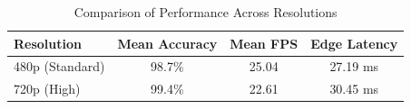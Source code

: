 \begin{table}[htbp]
\caption{Comparison of Performance Across Resolutions}
\label{tab:robustness_res}
\centering
\begin{tabular}{l c c c}
\hline
\hline
\textbf{Resolution} & \textbf{Mean Accuracy} & \textbf{Mean FPS} & \textbf{Edge Latency} \\
\hline
480p (Standard) & 98.7\% & 25.04 & 27.19 ms \\
720p (High)     & 99.4\% & 22.61 & 30.45 ms \\
\hline
\end{tabular}
\end{table}